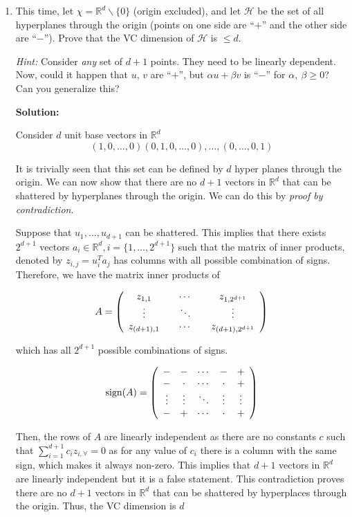 \documentclass[12pt]{article}
\begin{document}
\begin{enumerate}
\begin{enumerate}
\item This time, let $\chi = \mathbb{R}^{d}\backslash \{0\}$ (origin excluded), and let $\mathcal{H}$ be the set of all hyperplanes through the origin (points on one side are ``$+$'' and the other side are ``$-$''). Prove that the VC dimension of $\mathcal{H}$ is $\leq d$.

{\em Hint:} Consider {\em any} set of $d + 1$ points. They need to be linearly dependent. Now, could it happen that $u$, $v$ are ``$+$'', but $\alpha u + \beta v$ is ``$-$'' for $\alpha,\ \beta\geq 0$? Can you generalize this?

{\bf Solution:}

Consider $d$ unit base vectors in $\mathbb{R}^{d}$
\[
  (1,0,\ldots,0)(0,1,0,\ldots,0),\ldots,(0,\ldots,0,1)
\]

It is trivially seen that this set can be defined by $d$ hyper planes through the origin. We can now show that there are no $d+1$ vectors in $\mathbb{R}^{d}$ that can be shattered by hyperplanes through the origin. We can do this by {\em proof by contradiction}.

Suppose that $u_{1},\ldots,u_{d+1}$ can be shattered. This implies that there exists $2^{d+1}$ vectors $a_{i} \in \mathbb{R}^{d}, i = \{1,\ldots,2^{d+1}\}$ such that the matrix of inner products, denoted by $z_{i,j} = u_{i}^{T}a_{j}$ has columns with all possible combination of signs. Therefore, we have the matrix inner products of

\[
  A = \left( \begin{array}{c c c c c}z_{1,1} & & \cdots & & z_{1,2^{d+1}}\\
                          \vdots &  & \ddots & & \vdots\\
                          z_{(d+1),1} & & \cdots & & z_{(d+1),2^{d+1}}\end{array}\right)
\]

which has all $2^{d+1}$ possible combinations of signs.

\[
   \text{sign}(A) = \left(\begin{array}{c c c c c}- & - & \cdots & - & +\\
                          - & \cdot & \cdots & \cdot & +\\
                          \vdots & \vdots & \ddots & \vdots & \vdots\\
                          - & + & \cdots & \cdot & +\end{array}\right)
\]

Then, the rows of $A$ are linearly independent as there are no constants $c$ such that $\sum_{i=1}^{d+1}c_{i}z_{i,\forall} = 0$ as for any value of $c_{i}$ there is a column with the same sign, which makes it always non-zero. This implies that $d+1$ vectors in $\mathbb{R}^{d}$ are linearly independent but it is a false statement. This contradiction proves there are no $d+1$ vectors in $\mathbb{R}^{d}$ that can be shattered by hyperplaces through the origin. Thus, the VC dimension is $d$


\end{enumerate}
\end{enumerate}
\end{document}
